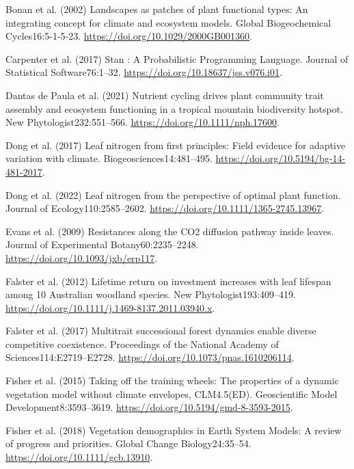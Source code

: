 \documentclass[
  12pt,
  letterpaper,
  DIV=11,
  numbers=noendperiod]{scrartcl}
\newlength{\cslhangindent}
\newenvironment{CSLReferences}[2] %
 {\begin{list}{}{%
  \setlength{\itemindent}{0pt}
  \setlength{\leftmargin}{0pt}
  \setlength{\parsep}{0pt}
  \ifodd #1
   \setlength{\leftmargin}{\cslhangindent}
   \setlength{\itemindent}{-1\cslhangindent}
  \fi
  \setlength{\itemsep}{#2\baselineskip}}}
 {\end{list}}
\begin{document}
\label{refs}
\begin{CSLReferences}{1}{1}
Bonan et al. (2002) Landscapes as patches of plant functional types:
{An} integrating concept for climate and ecosystem models. Global
Biogeochemical Cycles16:5-1-5-23.
\url{https://doi.org/10.1029/2000GB001360}.

Carpenter et al. (2017) Stan : {A Probabilistic Programming Language}.
Journal of Statistical Software76:1--32.
\url{https://doi.org/10.18637/jss.v076.i01}.

Dantas de Paula et al. (2021) Nutrient cycling drives plant community
trait assembly and ecosystem functioning in a tropical mountain
biodiversity hotspot. New Phytologist232:551--566.
\url{https://doi.org/10.1111/nph.17600}.

Dong et al. (2017) Leaf nitrogen from first principles: Field evidence
for adaptive variation with climate. Biogeosciences14:481--495.
\url{https://doi.org/10.5194/bg-14-481-2017}.

Dong et al. (2022) Leaf nitrogen from the perspective of optimal plant
function. Journal of Ecology110:2585--2602.
\url{https://doi.org/10.1111/1365-2745.13967}.

Evans et al. (2009) Resistances along the {CO2} diffusion pathway inside
leaves. Journal of Experimental Botany60:2235--2248.
\url{https://doi.org/10.1093/jxb/erp117}.

Falster et al. (2012) Lifetime return on investment increases with leaf
lifespan among 10 {Australian} woodland species. New
Phytologist193:409--419.
\url{https://doi.org/10.1111/j.1469-8137.2011.03940.x}.

Falster et al. (2017) Multitrait successional forest dynamics enable
diverse competitive coexistence. Proceedings of the National Academy of
Sciences114:E2719--E2728. \url{https://doi.org/10.1073/pnas.1610206114}.

Fisher et al. (2015) Taking off the training wheels: The properties of a
dynamic vegetation model without climate envelopes, {CLM4}.5({ED}).
Geoscientific Model Development8:3593--3619.
\url{https://doi.org/10.5194/gmd-8-3593-2015}.

Fisher et al. (2018) Vegetation demographics in {Earth System Models}:
{A} review of progress and priorities. Global Change Biology24:35--54.
\url{https://doi.org/10.1111/gcb.13910}.


\end{CSLReferences}
\end{document}
